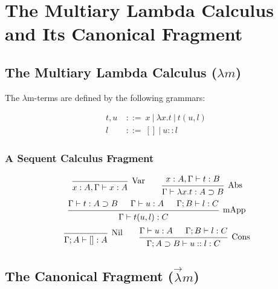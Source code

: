 \chapter{The Multiary Lambda Calculus and Its Canonical Fragment }
\label{c:multiary}

\section{The Multiary Lambda Calculus ($\lambda m$)}

\begin{definition}
	The $\lambda$m-terms are defined by the following grammars:
	
	\begin{align*} 
		t, u \ &::= \ x \ | \ \lambda x . t \ | \ t(u, l) \ \\
		l      &::= \ []\  | \ u :: l
	\end{align*}
\end{definition}

\subsection{A Sequent Calculus Fragment}

\begin{definition}
	\[
	\begin{prooftree}
		\infer0[Var]{ x:A, \Gamma \vdash x:A } 
	\end{prooftree}
	\qquad
	\begin{prooftree}
		\hypo{ x:A, \Gamma \vdash t:B }
		\infer1[Abs]{ \Gamma \vdash \lambda x . t : A \supset B  } 
	\end{prooftree}
	\]
	\[
	\begin{prooftree}
		\hypo{ \Gamma \vdash t : A \supset B }
		\hypo{ \Gamma \vdash u : A }
		\hypo{ \Gamma ; B \vdash l : C }	
		\infer3[mApp]{ \Gamma \vdash t(u, l) : C } 
	\end{prooftree}
	\]
	\[
	\begin{prooftree}
		\infer0[Nil]{ \Gamma ; A \vdash []:A } 
	\end{prooftree}
	\qquad
	\begin{prooftree}
		\hypo{ \Gamma \vdash u:A }
		\hypo{ \Gamma ; B \vdash l:C }
		\infer2[Cons]{ \Gamma ; A \supset B \vdash  u::l : C } 
	\end{prooftree}
	\]
\end{definition}

\section{The Canonical Fragment ($\vec \lambda m$)}

